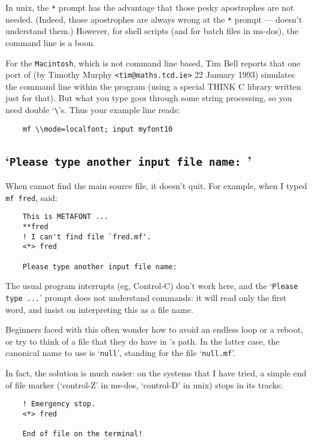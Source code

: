In {\sc unix}, the {\tt **} prompt has the advantage that those pesky
apostrophes are not needed.  (Indeed, those apostrophes are always
wrong at the {\tt **} prompt --- \MF{} doesn't understand them.)
However, for shell scripts (and for batch files in {\sc ms-dos}),
the command line is a boon.

For the {\tt Macintosh}, which is not command line based,
Tim {\sc Bell} reports that one port of \MF{}
(by Timothy {\sc Murphy\/} {\tt <tim@maths.tcd.ie>} 22 January 1993)
simulates the command line within the program
(using a special THINK C library written just for that).
But what you type goes through some string processing,
so you need double `\verb+\+'s.
Thus your example line reads:
\begin{verbatim}
    mf \\mode=localfont; input myfont10
\end{verbatim}


\subsection{`{\tt Please type another input file name: }'}%
\label{sub:another}

When \MF{} cannot find the main source file, it doesn't quit.
For example, when I typed {\tt mf fred}, \MF{} said:
\begin{verbatim}
    This is METAFONT ...
    **fred
    ! I can't find file `fred.mf'.
    <*> fred

    Please type another input file name: 
\end{verbatim}
The usual program interrupts (eg, Control-C) don't work here,
and the `{\tt Please type ...}' prompt does not understand
\MF{} commands:  it will read only the first word, and insist on
interpreting this as a file name.

Beginners faced with this often wonder how to avoid an endless loop
or a reboot, or try to think of a \MF{} file that they do have
in \MF{}'s path.  In the latter case, the canonical name to use
is `{\tt null}', standing for the file `{\tt null.mf}'.

In fact, the solution is much easier:  on the
systems that I have tried, a simple end of file marker
(`control-Z' in {\sc ms-dos}, `control-D' in {\sc unix})
stops \MF{} in its tracks:
\begin{verbatim}
    ! Emergency stop.
    <*> fred

    End of file on the terminal!
\end{verbatim}


